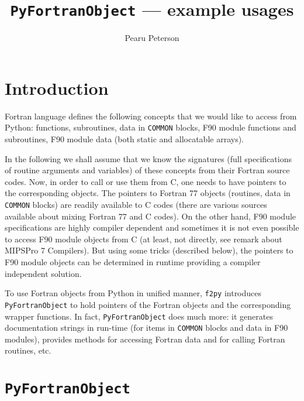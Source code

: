 \documentclass{article}
\title{\texttt{PyFortranObject} --- example usages}
\author{
\large Pearu Peterson\\
\small \email{pearu@cens.ioc.ee}
}
\newcommand{\fpy}{\texttt{f2py}\xspace}
\begin{document}
\maketitle


\tableofcontents

\section{Introduction}
\label{sec:intro}

Fortran language defines the following concepts that we would like to
access from Python: functions, subroutines, data in \texttt{COMMON} blocks,
F90 module functions and subroutines, F90 module data (both static and
allocatable arrays).

In the following we shall assume that we know the signatures (full
specifications of routine arguments and variables) of these concepts
from their Fortran source codes.  Now, in order to call or use them
from C, one needs to have pointers to the corresponding objects. The
pointers to Fortran 77 objects (routines, data in \texttt{COMMON}
blocks) are readily available to C codes (there are various sources
available about mixing Fortran 77 and C codes). On the other hand, F90
module specifications are highly compiler dependent and sometimes it
is not even possible to access F90 module objects from C (at least,
not directly, see remark about MIPSPro 7 Compilers). But using some
tricks (described below), the pointers to F90 module objects can be
determined in runtime providing a compiler independent solution.

To use Fortran objects from Python in unified manner, \fpy introduces
\texttt{PyFortranObject} to hold pointers of the Fortran objects and
the corresponding wrapper functions.  In fact, \texttt{PyFortranObject}
does much more: it generates documentation strings in run-time (for
items in \texttt{COMMON} blocks and data in F90 modules), provides
methods for accessing Fortran data and for calling Fortran routines,
etc.

\section{\texttt{PyFortranObject}}
\label{sec:pyfortobj}
\end{document}
